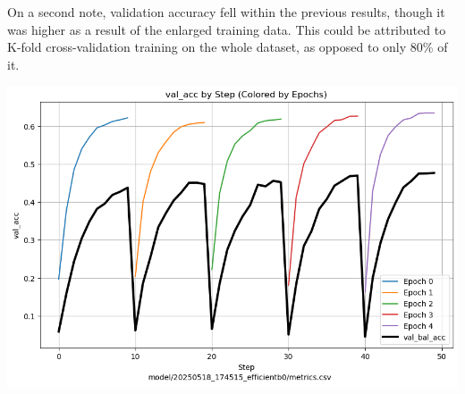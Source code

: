 \documentclass[10pt]{article}
\begin{document}
\vspace{1em}

\begin{minipage}{0.55\linewidth}
On a second note, validation accuracy fell within the previous results, though it was higher as a result of the enlarged training data. This could be attributed to K-fold cross-validation training on the whole dataset, as opposed to only 80\% of it.
\end{minipage}
\hfill
\begin{minipage}{0.35\linewidth}
  \includegraphics[width=\linewidth]{img/efficientb_acc_kfold.png}
\end{minipage}
\end{document}
